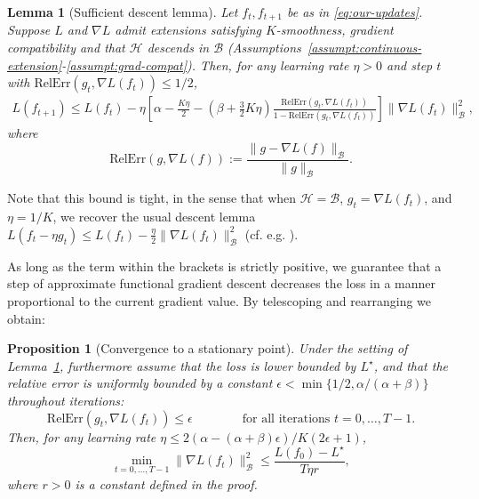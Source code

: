\documentclass{article}
\newtheorem{lemma}[theorem]{Lemma}
\newtheorem{proposition}[theorem]{Proposition}
\renewcommand{\H}{\mathcal{H}}
\newcommand{\B}{\mathcal{B}}
\newcommand{\RelErr}{\mathrm{RelErr}}
\begin{document}
\begin{lemma}[Sufficient descent lemma]\label{lemma:sufficient-descent-lemma}
    Let $f_t, f_{t+1}$ be as in \eqref{eq:our-updates}.
    Suppose $L$ and $\nabla L$ admit extensions satisfying $K$-smoothness, gradient compatibility and that $\mathcal{H}$ descends in $\mathcal{B}$ (Assumptions~\ref{assumpt:continuous-extension}-\ref{assumpt:grad-compat}).
    Then, for any learning rate $\eta > 0$ and step $t$ with $\RelErr(g_t, \nabla L(f_t)) \leq 1/2$,
    \begin{align*}
        L(f_{t+1})
        \leq L(f_t) - \eta \left[ \alpha - \frac{K \eta}{2} - \left( \beta + \frac{3}{2} K \eta \right) \frac{\RelErr(g_t, \nabla L(f_t))}{1-\RelErr(g_t, \nabla L(f_t))} \right] \lVert \nabla L(f_t) \rVert_\B^2,
    \end{align*}
    where
    \begin{equation}
        \RelErr(g, \nabla L(f)) := \frac{\lVert g - \nabla L(f) \rVert_\B}{\lVert g \rVert_\B}.
    \end{equation}
\end{lemma}

Note that this bound is tight, in the sense that when $\H = \B$, $g_t = \nabla L(f_t)$, and $\eta = 1/K$, we recover the usual descent lemma $L(f_t - \eta g_t) \leq L(f_t) - \frac{\eta}{2} \lVert \nabla L(f_t) \rVert_\B^2$ (cf. e.g. \citep{optimization-book}).

As long as the term within the brackets is strictly positive, we guarantee that a step of approximate functional gradient descent decreases the loss in a manner proportional to the current gradient value.
By telescoping and rearranging we obtain:

\begin{proposition}[Convergence to a stationary point]\label{prop:convergence-to-stationary-point}
    Under the setting of Lemma~\ref{lemma:sufficient-descent-lemma}, furthermore assume that the loss is lower bounded by $L^\star$,
    and that the relative error is uniformly bounded by a constant $\epsilon < \min \{ 1/2, \alpha/(\alpha+\beta) \}$ throughout iterations:
    \[ \RelErr(g_t, \nabla L(f_t)) \leq \epsilon \qquad\qquad \text{for all iterations } t = 0, \ldots, T-1. \]
    Then, for any learning rate $\eta \leq 2 (\alpha - (\alpha + \beta) \epsilon) / K ( 2\epsilon + 1 )$,
    \[ \min_{t = 0, \ldots, T-1} \lVert \nabla L(f_t) \rVert_\B^2 \leq \frac{L(f_0) - L^\star}{T \eta r}, \]
    where $r>0$ is a constant defined in the proof.
\end{proposition}
\end{document}
